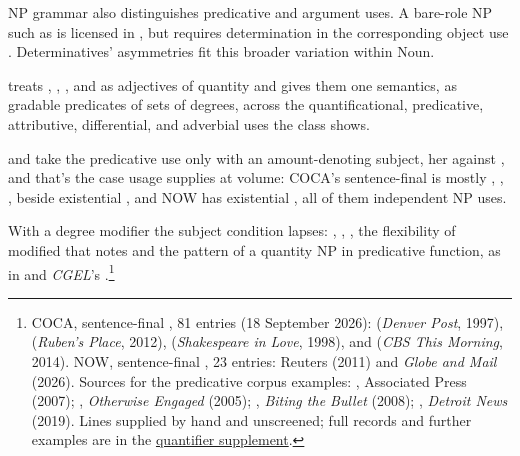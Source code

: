 \documentclass[12pt]{article}
\begin{document}
NP grammar also distinguishes predicative and argument uses. A bare-role NP such as  is licensed in , but requires determination in the corresponding object use  \citep[328]{huddleston2002}. Determinatives' asymmetries fit this broader variation within Noun.

\textcite{solt2015qadjectives} treats , , , and  as adjectives of quantity and gives them one semantics, as gradable predicates of sets of degrees, across the quantificational, predicative, attributive, differential, and adverbial uses the class shows.

 and  take the predicative use only with an amount-denoting subject, her  against , and that's the case usage supplies at volume: COCA's sentence-final  is mostly , , , beside existential , and NOW has existential , all of them independent NP uses.

With a degree modifier the subject condition lapses: , , , the flexibility of modified  that \textcite{reynolds2024why} notes and the pattern of a quantity NP in predicative function, as in  and \textit{CGEL}'s  \citep[395]{huddleston2002}.\footnote{COCA, sentence-final , 81 entries (18 September 2026):  (\textit{Denver Post}, 1997),  (\textit{Ruben's Place}, 2012),  (\textit{Shakespeare in Love}, 1998), and  (\textit{CBS This Morning}, 2014). NOW, sentence-final , 23 entries: Reuters (2011) and \textit{Globe and Mail} (2026). Sources for the predicative corpus examples: , Associated Press (2007); , \textit{Otherwise Engaged} (2005); , \textit{Biting the Bullet} (2008); , \textit{Detroit News} (2019). Lines supplied by hand and unscreened; full records and further examples are in the \href{run:quantifier-controls.pdf}{quantifier supplement}.}
\end{document}
